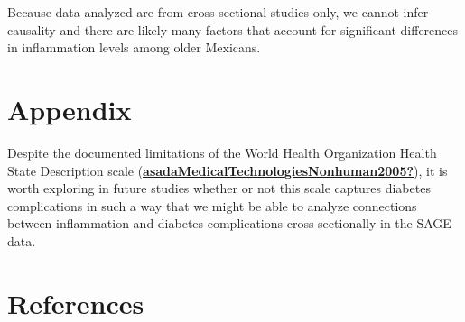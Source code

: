 \documentclass[
  man]{apa6}
\begin{document}
Because data analyzed are from cross-sectional studies only, we cannot infer causality and there are likely many factors that account for significant differences in inflammation levels among older Mexicans.

\newpage

\hypertarget{appendix}{%
\section{Appendix}\label{appendix}}

Despite the documented limitations of the World Health Organization Health State Description scale (\protect\hyperlink{ref-asadaMedicalTechnologiesNonhuman2005}{\textbf{asadaMedicalTechnologiesNonhuman2005?}}), it is worth exploring in future studies whether or not this scale captures diabetes complications in such a way that we might be able to analyze connections between inflammation and diabetes complications cross-sectionally in the SAGE data.

\newpage

\hypertarget{references}{%
\section{References}\label{references}}
\end{document}

